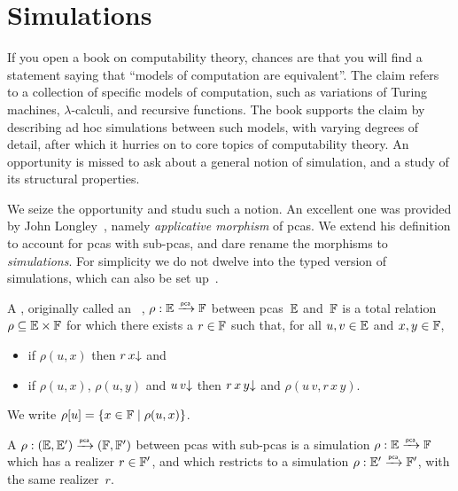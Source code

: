 \section{Simulations}
\label{sec:simulations}%

If you open a book on computability theory, chances are that you will find a statement saying that ``models of computation are equivalent''. The claim refers to a collection of specific models of computation, such as variations of Turing machines, $\lambda$-calculi, and recursive functions. The book supports the claim by describing ad hoc simulations between such models, with varying degrees of detail, after which it hurries on to core topics of computability theory. An opportunity is missed to ask about a general notion of simulation, and a study of its structural properties.


We seize the opportunity and studu such a notion. An excellent one was provided by John Longley~, namely \emph{applicative morphism} of pcas. We extend his definition to account for pcas with sub-pcas, and dare rename the morphisms to \emph{simulations}. For simplicity we do not dwelve into the typed version of simulations, which can also be set up~\cite{longley99:_match}.

\begin{definition}
  \label{def:simulation}%
  A , originally called an ~\cite{Longley:94},
  $\rho: {\mathbb{E}} \xrightarrow{\scriptscriptstyle\mathsf{pca}}{} {\mathbb{F}}$ between pcas~${\mathbb{E}}$ and~${\mathbb{F}}$ is a total relation $\rho
  \subseteq {\mathbb{E}} \times {\mathbb{F}}$ for which there exists a  $r \in {\mathbb{F}}$
  such that, for all $u, v \in {\mathbb{E}}$ and $x, y \in {\mathbb{F}}$,
  \begin{itemize}
  \item if $\rho(u, x)$ then $r \, x{\downarrow}$ and
  \item if $\rho(u, x)$, $\rho(u, y)$ and $u \, v{\downarrow}$ then
    $r \, x \, y{\downarrow}$ and $\rho(u \, v, r \, x \, y)$.
  \end{itemize}
  We write $\rho[u] = \{x \in {\mathbb{F}} \mid \rho(u, x)\}$.

  A  $\rho: ({\mathbb{E}}, {\mathbb{E}'}) \xrightarrow{\scriptscriptstyle\mathsf{pca}}{} ({\mathbb{F}}, {\mathbb{F}'})$ between pcas with sub-pcas is a simulation
  $\rho : {\mathbb{E}} \xrightarrow{\scriptscriptstyle\mathsf{pca}}{} {\mathbb{F}}$ which has a realizer $r \in {\mathbb{F}'}$, and which restricts to a simulation
  $\rho : {\mathbb{E}'} \xrightarrow{\scriptscriptstyle\mathsf{pca}}{} {\mathbb{F}'}$, with the same realizer~$r$.
\end{definition}

